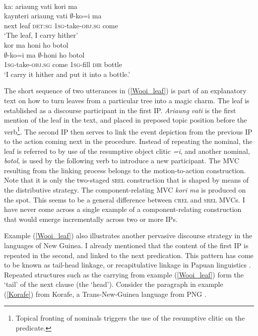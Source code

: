 \ea \label{Wooi_leaf}
\\
\ea
\glll ka: ariaung vati kori ma \\
kaynteri ariaung vati $\emptyset$-ko=i ma \\
next leaf \textsc{det}:\textsc{sg} \textsc{1}\textsc{sg}-take-\textsc{obj}.\textsc{sg} come \\
\glft `The leaf, I carry hither' \\ 
\ex
\glll kor ma honi ho botol \\
$\emptyset$-ko=i ma $\emptyset$-honi ho botol \\
\textsc{1}\textsc{sg}-take-\textsc{obj}.\textsc{sg} come \textsc{1}\textsc{sg}-fill \textsc{dir} bottle \\
\glft `I carry it hither and put it into a bottle.'\\
\z
\z

The short sequence of two utterances in (\ref{Wooi_leaf}) is part of an explanatory text on how to turn leaves from a particular tree into a magic charm. The leaf is established as a discourse participant in the first IP. \textit{Ariaung vati} is the first mention of the leaf in the text, and placed in preposed topic position before the verb\footnote{Topical fronting of nominals triggers the use of the resumptive clitic on the predicate.}. The second IP then serves to link the event depiction from the previous IP to the action coming next in the procedure. Instead of repeating the nominal, the leaf is referred to by use of the resumptive object clitic \textit{=i}, and another nominal, \textit{botol}, is used by the following verb to introduce a new participant. The MVC resulting from the linking process belongs to the motion-to-action construction. Note that it is only the two-staged \textsc{srel} construction that is shaped by means of the distributive strategy. The component-relating MVC \textit{kori ma} is produced on the spot. This seems to be a general difference between \textsc{crel} and \textsc{srel} MVCs. I have never come across a single example of a component-relating construction that would emerge incrementally across two or more IPs.

Example (\ref{Wooi_leaf}) also illustrates another pervasive discourse strategy in the languages of New Guinea. I already mentioned that the content of the first IP is repeated in the second, and linked to the next predication. This pattern has come to be known as tail-head linkage, or recapitulative linkage in Papuan linguistics \citep{devries2005towards, devries2006areal}. Repeated structures such as the carrying from example (\ref{Wooi_leaf}) form the `tail' of the next clause (the `head'). Consider the paragraph in example (\ref{Korafe}) from Korafe, a Trans-New-Guinea language from PNG \citep{farr1999interface}.

